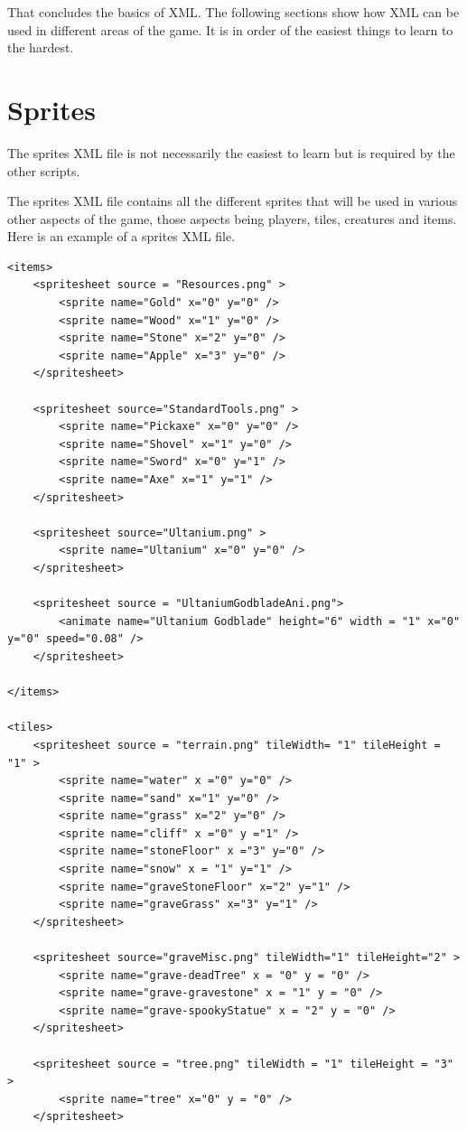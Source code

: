 \documentclass{book}
\begin{document}
	That concludes the basics of XML. The following sections show how XML can be used in different areas of the game. It is in order of the easiest things to learn to the hardest.
	
	\section{Sprites}
	The sprites XML file is not necessarily the easiest to learn but is required by the other scripts.

	The sprites XML file contains all the different sprites that will be used in various other aspects of the game, those aspects being players, tiles, creatures and items. Here is an example of a sprites XML file.

\begin{verbatim}
<items>
	<spritesheet source = "Resources.png" >
		<sprite name="Gold" x="0" y="0" />
		<sprite name="Wood" x="1" y="0" />
		<sprite name="Stone" x="2" y="0" />
		<sprite name="Apple" x="3" y="0" />
	</spritesheet>

	<spritesheet source="StandardTools.png" >
		<sprite name="Pickaxe" x="0" y="0" />
		<sprite name="Shovel" x="1" y="0" />
		<sprite name="Sword" x="0" y="1" />
		<sprite name="Axe" x="1" y="1" />
	</spritesheet>

	<spritesheet source="Ultanium.png" >
		<sprite name="Ultanium" x="0" y="0" />
	</spritesheet>

	<spritesheet source = "UltaniumGodbladeAni.png">
		<animate name="Ultanium Godblade" height="6" width = "1" x="0" y="0" speed="0.08" />
	</spritesheet>

</items>

<tiles>
	<spritesheet source = "terrain.png" tileWidth= "1" tileHeight = "1" >
		<sprite name="water" x ="0" y="0" />
		<sprite name="sand" x="1" y="0" />
		<sprite name="grass" x="2" y="0" />
		<sprite name="cliff" x ="0" y ="1" />
		<sprite name="stoneFloor" x ="3" y="0" />
		<sprite name="snow" x = "1" y="1" />
		<sprite name="graveStoneFloor" x="2" y="1" />
		<sprite name="graveGrass" x="3" y="1" />
	</spritesheet>

	<spritesheet source="graveMisc.png" tileWidth="1" tileHeight="2" >
		<sprite name="grave-deadTree" x = "0" y = "0" />
		<sprite name="grave-gravestone" x = "1" y = "0" />
		<sprite name="grave-spookyStatue" x = "2" y = "0" />
	</spritesheet>

	<spritesheet source = "tree.png" tileWidth = "1" tileHeight = "3" >
		<sprite name="tree" x="0" y = "0" />
	</spritesheet>


\end{verbatim}
\end{document}
